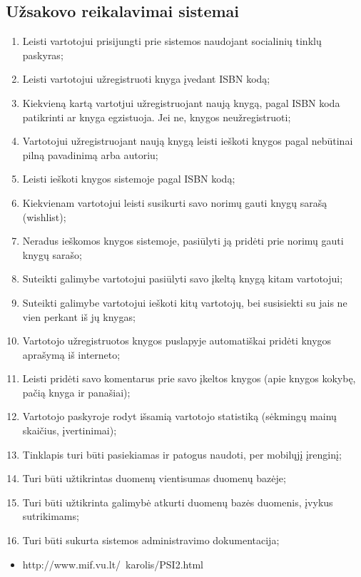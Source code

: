 \documentclass{VUMIFPSkursinis}
\begin{document}
\subsection{Užsakovo reikalavimai sistemai}
\begin{enumerate}
	\item Leisti vartotojui prisijungti prie sistemos naudojant socialinių tinklų paskyras;
	\item Leisti vartotojui užregistruoti knyga įvedant ISBN kodą;
	\item Kiekvieną kartą vartotjui užregistruojant naują knygą, pagal ISBN koda patikrinti
		ar knyga egzistuoja. Jei ne, knygos neužregistruoti;
	\item Vartotojui užregistruojant naują knygą leisti ieškoti knygos pagal 
		nebūtinai pilną pavadinimą arba autoriu;
	\item Leisti ieškoti knygos sistemoje pagal ISBN kodą;
	\item Kiekvienam vartotojui leisti susikurti savo norimų gauti knygų sarašą (wishlist);
	\item Neradus ieškomos knygos sistemoje, pasiūlyti ją pridėti prie norimų gauti knygų sarašo;
	\item Suteikti galimybe vartotojui pasiūlyti savo įkeltą knygą kitam vartotojui;
	\item Suteikti galimybe vartotojui ieškoti kitų vartotojų, bei susisiekti su jais ne vien
		perkant iš jų knygas;
	\item Vartotojo užregistruotos knygos puslapyje automatiškai pridėti knygos aprašymą
		iš interneto;
	\item Leisti pridėti savo komentarus prie savo įkeltos knygos (apie knygos kokybę,
		pačią knyga ir panašiai);
	\item Vartotojo paskyroje rodyt išsamią vartotojo statistiką (sėkmingų mainų skaičius,
		įvertinimai);
	\item Tinklapis turi būti pasiekiamas ir patogus naudoti, per mobilųjį įrenginį;
	\item Turi būti užtikrintas duomenų vientisumas duomenų bazėje;
	\item Turi būti užtikrinta galimybė atkurti duomenų bazės duomenis, įvykus sutrikimams;
	\item Turi būti sukurta sistemos administravimo dokumentacija;
\end{enumerate}


\setcounter{secnumdepth}{4}


	\begin{itemize}
		\item http://www.mif.vu.lt/~karolis/PSI2.html
	\end{itemize}

\end{document}
